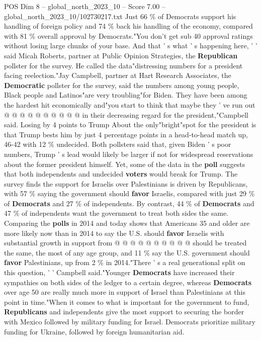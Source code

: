 \begin{textsample}{POS Dim 8 – global\_north\_2023\_10 – Score 7.00 – global\_north\_2023\_10/102730217.txt}
Just 66 \% of Democrats support his handling of foreign policy and 74 \% back his handling of the economy, compared with 81 \% overall approval by Democrats."You don't get sub 40 approval ratings without losing large chunks of your base.
And that ' s what ' s happening here, ' ' said Micah Roberts, partner at Public Opinion Strategies, the \textbf{Republican} pollster for the survey.
He called the data"distressing numbers for a president facing reelection."Jay Campbell, partner at Hart Research Associates, the \textbf{Democratic} pollster for the survey, said the numbers among young people, Black people and Latinos"are very troubling"for Biden.
They have been among the hardest hit economically and"you start to think that maybe they ' ve run out @ @ @ @ @ @ @ @ @ @ in their decreasing regard for the president,"Campbell said.
Losing by 4 points to Trump About the only"bright"spot for the president is that Trump bests him by just 4 percentage points in a head-to-head match up, 46-42 with 12 \% undecided.
Both pollsters said that, given Biden ' s poor numbers, Trump ' s lead would likely be larger if not for widespread reservations about the former president himself.
Yet, some of the data in the \textbf{poll} suggests that both independents and undecided \textbf{voters} would break for Trump.
The survey finds the support for Israelis over Palestinians is driven by Republicans, with 57 \% saying the government should \textbf{favor} Israelis, compared with just 29 \% of \textbf{Democrats} and 27 \% of independents.
By contrast, 44 \% of \textbf{Democrats} and 47 \% of independents want the government to treat both sides the same.
Comparing the \textbf{polls} in 2014 and today shows that Americans 35 and older are more likely now than in 2014 to say the U.S. should \textbf{favor} Israelis with substantial growth in support from @ @ @ @ @ @ @ @ @ @ should be treated the same, the most of any age group, and 11 \% say the U.S. government should \textbf{favor} Palestinians, up from 2 \% in 2014."There ' s a real generational split on this question, ' ' Campbell said."Younger \textbf{Democrats} have increased their sympathies on both sides of the ledger to a certain degree, whereas \textbf{Democrats} over age 50 are really much more in support of Israel than Palestinians at this point in time."When it comes to what is important for the government to fund, \textbf{Republicans} and independents give the most support to securing the border with Mexico followed by military funding for Israel.
Democrats prioritize military funding for Ukraine, followed by foreign humanitarian aid.

\end{textsample}
